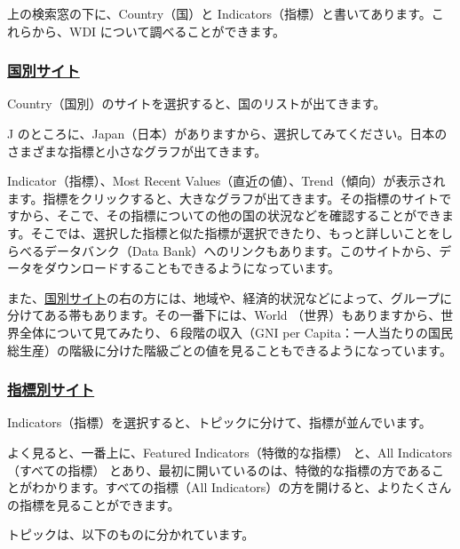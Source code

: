 \documentclass[
  xelatex, ja=standard]{bxjsbook}
\theoremstyle{definition}
\theoremstyle{definition}
\theoremstyle{definition}
\theoremstyle{definition}
\theoremstyle{remark}
\begin{document}
上の検索窓の下に、Country（国）と Indicators（指標）と書いてあります。これらから、WDI について調べることができます。

\hypertarget{ux56fdux5225ux30b5ux30a4ux30c8}{%
\subsubsection{\texorpdfstring{\href{https://data.worldbank.org/country}{国別サイト}}{国別サイト}}\label{ux56fdux5225ux30b5ux30a4ux30c8}}

Country（国別）のサイトを選択すると、国のリストが出てきます。

J のところに、Japan（日本）がありますから、選択してみてください。日本のさまざまな指標と小さなグラフが出てきます。

Indicator（指標）、Most Recent Values（直近の値）、Trend（傾向）が表示されます。指標をクリックすると、大きなグラフが出てきます。その指標のサイトですから、そこで、その指標についての他の国の状況などを確認することができます。そこでは、選択した指標と似た指標が選択できたり、もっと詳しいことをしらべるデータバンク（Data Bank）へのリンクもあります。このサイトから、データをダウンロードすることもできるようになっています。

また、\href{https://data.worldbank.org/country}{国別サイト}の右の方には、地域や、経済的状況などによって、グループに分けてある帯もあります。その一番下には、World （世界）もありますから、世界全体について見てみたり、６段階の収入（GNI per Capita：一人当たりの国民総生産）の階級に分けた階級ごとの値を見ることもできるようになっています。

\hypertarget{ux6307ux6a19ux5225ux30b5ux30a4ux30c8}{%
\subsubsection{\texorpdfstring{\href{https://data.worldbank.org/indicator}{指標別サイト}}{指標別サイト}}\label{ux6307ux6a19ux5225ux30b5ux30a4ux30c8}}

Indicators（指標）を選択すると、トピックに分けて、指標が並んでいます。

よく見ると、一番上に、Featured Indicators（特徴的な指標） と、All Indicators（すべての指標） とあり、最初に開いているのは、特徴的な指標の方であることがわかります。すべての指標（All Indicators）の方を開けると、よりたくさんの指標を見ることができます。

トピックは、以下のものに分かれています。
\end{document}

